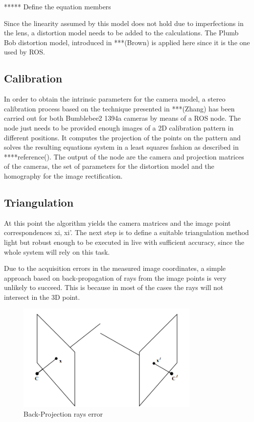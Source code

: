 ***** Define the equation members

Since the linearity assumed by this model does not hold due to imperfections in the lens, a distortion model needs to be added to the calculations. The Plumb Bob distortion model, introduced in ***(Brown) is applied here since it is the one used by ROS.

\subsection{Calibration}
In order to obtain the intrinsic parameters for the camera model, a stereo calibration process based on the technique presented in ***(Zhang) has been carried out for both Bumblebee2 1394a cameras by means of a ROS node. 
The node just needs to be provided enough images of a 2D calibration pattern in different positions. It computes the projection of the points on the pattern and solves the resulting equations system in a least squares fashion as described in ****reference(). The output of the node are the camera and projection matrices of the cameras, the set of parameters for the distortion model and the homography for the image rectification. 

\subsection{Triangulation}
At this point the algorithm yields the camera matrices and the image point correspondences {xi, xi'}.
The next step is to define a suitable triangulation method light but robust enough to be executed in live with sufficient accuracy, since the whole system will rely on this task. 

Due to the acquisition errors in the measured image coordinates, a simple approach based on back-propagation of rays from the image points is very unlikely to succeed. This is because in most of the cases the rays will not intersect in the 3D point. 

\begin{figure}[h]
    \centering
    \includegraphics[width=0.8\textwidth]{images/Back-Projection}
    \caption{Back-Projection rays error}
    \label{fig:Back-Projection}
\end{figure}


